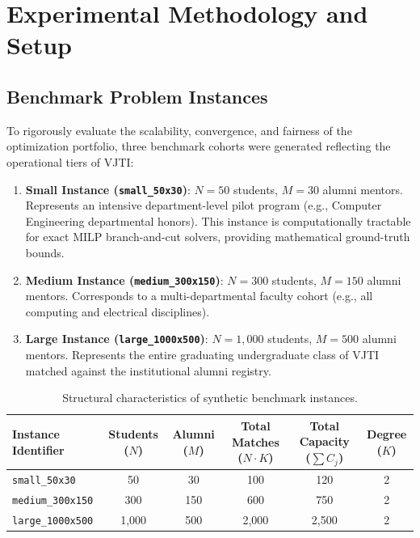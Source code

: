 \chapter{Experimental Methodology and Setup}
\label{ch:experiments}

\section{Benchmark Problem Instances}
To rigorously evaluate the scalability, convergence, and fairness of the optimization portfolio, three benchmark cohorts were generated reflecting the operational tiers of VJTI:
\begin{enumerate}
    \item \textbf{Small Instance (\texttt{small\_50x30})}: $N = 50$ students, $M = 30$ alumni mentors. Represents an intensive department-level pilot program (e.g., Computer Engineering departmental honors). This instance is computationally tractable for exact MILP branch-and-cut solvers, providing mathematical ground-truth bounds.
    \item \textbf{Medium Instance (\texttt{medium\_300x150})}: $N = 300$ students, $M = 150$ alumni mentors. Corresponds to a multi-departmental faculty cohort (e.g., all computing and electrical disciplines).
    \item \textbf{Large Instance (\texttt{large\_1000x500})}: $N = 1,000$ students, $M = 500$ alumni mentors. Represents the entire graduating undergraduate class of VJTI matched against the institutional alumni registry.
\end{enumerate}

\begin{table}[htbp]
    \centering
    \caption{Structural characteristics of synthetic benchmark instances.}
    \label{tab:instances}
    \begin{tabularx}{\textwidth}{lccccc}
        \toprule
        \textbf{Instance Identifier} & \textbf{Students ($N$)} & \textbf{Alumni ($M$)} & \textbf{Total Matches ($N \cdot K$)} & \textbf{Total Capacity ($\sum C_j$)} & \textbf{Degree ($K$)} \\
        \midrule
        \texttt{small\_50x30} & 50 & 30 & 100 & 120 & 2 \\
        \texttt{medium\_300x150} & 300 & 150 & 600 & 750 & 2 \\
        \texttt{large\_1000x500} & 1,000 & 500 & 2,000 & 2,500 & 2 \\
        \bottomrule
    \end{tabularx}
\end{table}

